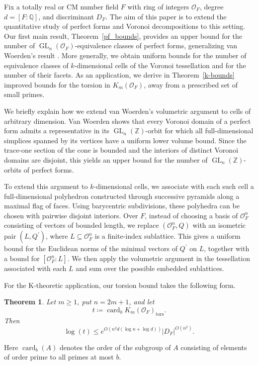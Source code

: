 \documentclass[11pt,a4paper,twoside]{amsart}
\theoremstyle{plain}
\newtheorem*{introtheorem}{\bfseries Theorem}
\theoremstyle{definition}
\newcommand{\rint}[0]{\mathcal{O}_F}
\newcommand{\disc}[0]{D_F}
\newcommand{\GL}[0]{\operatorname{GL}_n(\mathbb{Z})}
\newcommand{\GLo}[0]{\operatorname{GL}_n({\mathcal{O}_F})}
\renewcommand{\leq}{\leqslant}
\renewcommand{\geq}{\geqslant}
\begin{document}
Fix a totally real or CM number field $F$ with ring of integers $\rint$, degree $d=[F:\mathbb Q]$, and discriminant $\disc$. The aim of this paper is to extend the quantitative study of perfect forms and Voronoi decompositions to this setting. Our first main result, Theorem~\ref{pf_bounds}, provides an upper bound for the number of $\GLo$-equivalence classes of perfect forms, generalizing van Woerden's result \cite{woerden}. More generally, we obtain uniform bounds for the number of equivalence classes of $k$-dimensional cells of the Voronoi tessellation and for the number of their facets. As an application, we derive in Theorem~\ref{k-bounds} improved bounds for the torsion in $K_m(\mathcal O_F)$, away from a prescribed set of small primes.

We briefly explain how we extend van Woerden's volumetric argument \cite{woerden} to cells of arbitrary dimension. Van Woerden shows that every Voronoi domain of a perfect form admits a representative in its $\GL$-orbit for which all full-dimensional simplices spanned by its vertices have a uniform lower volume bound. Since the trace-one section of the cone is bounded and the interiors of distinct Voronoi domains are disjoint, this yields an upper bound for the number of $\GL$-orbits of perfect forms.

To extend this argument to $k$-dimensional cells, we associate with each such cell a full-dimensional polyhedron constructed through successive pyramids along a maximal flag of faces. Using barycentric subdivisions, these polyhedra can be chosen with pairwise disjoint interiors. Over $F$, instead of choosing a basis of $\rint^n$ consisting of vectors of bounded length, we replace $(\rint^n,Q)$ with an isometric pair $(L,Q^\prime)$, where $L\subseteq\rint^n$ is a finite-index sublattice. This gives a uniform bound for the Euclidean norms of the minimal vectors of $Q^\prime$ on $L$, together with a bound for $[\rint^n:L]$. We then apply the volumetric argument in the tessellation associated with each $L$ and sum over the possible embedded sublattices. 

For the K-theoretic application, our torsion bound takes the following form.
\begin{introtheorem}
Let $m\geq1$, put $n=2m+1$, and let
$$t\coloneqq\operatorname{card}_{b} K_m(\rint)_{\mathrm{tors}}.$$
Then
$$\log(t)\leq e^{O(n^2d(\log n+\log d))}|\disc|^{O(n^2)}.$$
\end{introtheorem}
Here $\operatorname{card}_b(A)$ denotes the order of the subgroup
of $A$ consisting of elements of order prime to all primes at
most $b$.
\end{document}
